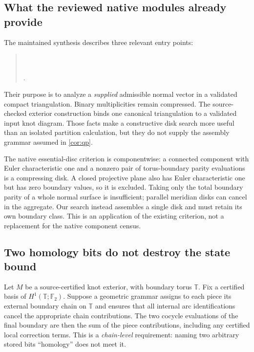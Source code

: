 \documentclass[11pt,a4paper]{article}
\theoremstyle{definition}
\theoremstyle{remark}
\newcommand{\F}{\mathbb F_2}
\begin{document}
\subsection{What the reviewed native modules already provide}
The maintained synthesis \cite{proveit-weighted} describes three relevant entry points:
\begin{quote}\small
{}\\
\\
.
\end{quote}
Their purpose is to analyze a \emph{supplied} admissible normal vector in a validated
compact triangulation. Binary multiplicities remain compressed. The source-checked
exterior construction \cite{proveit-exterior} binds one canonical triangulation to a
validated input knot diagram. Those facts make a constructive disk search more useful
than an isolated partition calculation, but they do not supply the assembly grammar
assumed in \cref{cor:qp}.

The native essential-disc criterion is componentwise: a connected component with
Euler characteristic one and a nonzero pair of torus-boundary parity evaluations is
a compressing disk. A closed projective plane also has Euler characteristic one but
has zero boundary values, so it is excluded. Taking only the total boundary parity of
a whole normal surface is insufficient; parallel meridian disks can cancel in the
aggregate. Our search instead assembles a single disk and must retain its own boundary
class. This is an application of the existing criterion, not a replacement for the
native component census.

\subsection{Two homology bits do not destroy the state bound}
Let $M$ be a source-certified knot exterior, with boundary torus $\mathbb T$.
Fix a certified basis of $H^1(\mathbb T;\F)$. Suppose a geometric grammar assigns
to each piece its external boundary chain on $\mathbb T$ and ensures that all internal
arc identifications cancel the appropriate chain contributions. The two cocycle
evaluations of the final boundary are then the sum of the piece contributions,
including any certified local correction terms. This is a \emph{chain-level}
requirement: naming two arbitrary stored bits ``homology'' does not meet it.
\end{document}
